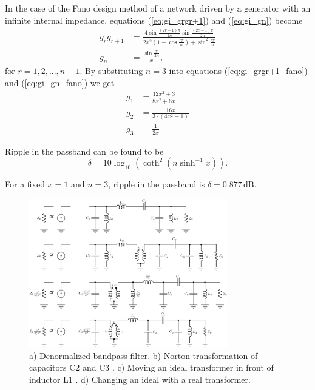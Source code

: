 \documentclass[lettersize,journal]{IEEEtran}
\begin{document}
In the case of the Fano design method of a network driven by a generator with an infinite internal impedance, equations
(\ref{eq:gi_grgr+1}) and (\ref{eq:gi_gn}) become
%
\begin{subequations} \label{eq:gi_all_fano}
    \begin{align}
       g_r g_{r + 1} &= \frac{4 \sin \frac{(2 r + 1) \pi}{2n} \sin \frac{(2e - 1) \pi}{2n}}{2x^2(1 - \cos\frac{r\pi}{n}) + \sin^2\frac{r\pi}{n}} \label{eq:gi_grgr+1_fano} \\
        g_n &= \frac{\sin \frac{\pi}{2n}}{x}, \label{eq:gi_gn_fano} 
    \end{align}
\end{subequations}
%
for $r = 1, 2, ..., n - 1$. By substituting $n = 3$ into equations (\ref{eq:gi_grgr+1_fano}) and (\ref{eq:gi_gn_fano}) we get
%
\begin{subequations} \label{eq:gi_all_val_fano}
	\begin{align}
		g_1 &= \frac{12 x^2 + 3}{8x^2 + 6x} \label{eq:g1_val_fano} \\
		g_2 &= \frac{16x}{3 \cdot (4x^2 + 1)} \label{eq:g2_val_fano} \\
		g_3 &= \frac{1}{2x} \label{eq:g3_val} 
	\end{align}
\end{subequations}

Ripple in the passband can be found to be 
%
\begin{equation}
	\label{eq:ripple_fano}
	\delta = 10 \log_{10} \left( \coth^2 \left( n \sinh^{-1} x \right) \right).
\end{equation}

For a fixed $x = 1$ and $n = 3$, ripple in the passband is $\delta = 0.877 \, \text{dB}$.

\begin{figure}[!t]
\centering
\includegraphics[width=3.4in]{./fig/denormalized_filter.pdf}
\caption{a) Denormalized bandpass filter. b) Norton transformation of capacitors
C2 and C3 . c) Moving an ideal transformer in front of inductor L1 . d)
Changing an ideal with a real transformer.}
\label{fig:denormalized_filter}
\end{figure}
\end{document}
